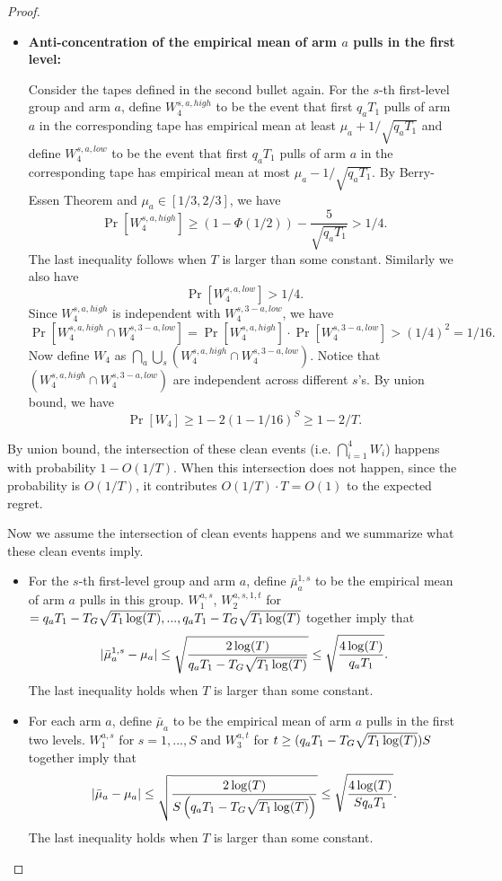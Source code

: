 \begin{proof}
\begin{itemize}
\item \textbf{Anti-concentration of the empirical mean of arm $a$ pulls in the first level:}

Consider the tapes defined in the second bullet again. For the $s$-th first-level group and arm $a$, define $W_4^{s,a,high}$  to be the event that first $q_a T_1$ pulls of arm $a$ in the corresponding tape has empirical mean at least $\mu_a + 1/\sqrt{q_a T_1}$ and define  $W_4^{s,a,low}$  to be the event that first $q_a T_1$ pulls of arm $a$ in the corresponding tape has empirical mean at most $\mu_a - 1/\sqrt{q_a T_1}$. By Berry-Essen Theorem and $\mu_a \in [1/3,2/3]$, we have
\[
\Pr[W_4^{s,a,high}] \geq (1-\Phi(1/2)) - \frac{5}{\sqrt{q_aT_1}} > 1/4.
\]
The last inequality follows when $T$ is larger than some constant.
Similarly we also have 
\[
\Pr[W_4^{s,a,low}] > 1/4.
\]
Since $W_4^{s,a,high}$ is independent with $W_4^{s,3-a,low}$, we have
\[
\Pr[W_4^{s,a,high} \cap W_4^{s,3-a,low}] =\Pr[W_4^{s,a,high}] \cdot  \Pr[W_4^{s,3-a,low}]>(1/4)^2 = 1/16.
\]
Now define $W_4$ as $\bigcap_a \bigcup_s (W_4^{s,a,high} \cap W_4^{s,3-a,low})$. Notice that $(W_4^{s,a,high} \cap W_4^{s,3-a,low})$ are independent across different $s$'s. By union bound, we have
\[
\Pr[W_4] \geq 1- 2(1-1/16)^S \geq 1 -2 /T.
\]
\end{itemize}

By union bound, the intersection of these clean events (i.e. $\bigcap_{i=1}^4 W_i$) happens with probability $1-O(1/T)$. When this intersection does not happen, since the probability is $O(1/T)$, it contributes $O(1/T) \cdot T = O(1)$ to the expected regret. 

Now we assume the intersection of clean events happens and we summarize what these clean events imply.

\begin{itemize}
\item For the $s$-th first-level group and arm $a$, define $\bar{\mu}_a^{1,s}$ to be the empirical mean of arm $a$ pulls in this group. $W_1^{a,s}$, $W_2^{a,s,1,t}$ for $ = q_a T_1- T_G \sqrt{T_1\log(T)},...,q_a T_1- T_G \sqrt{T_1\log(T)}$ together imply that
\[
|\bar{\mu}_a^{1,s} - \mu_a| \leq \sqrt{\frac{2\log(T)}{q_a T_1- T_G \sqrt{T_1\log(T)}}} \leq \sqrt{\frac{4\log(T)}{q_a T_1}}.
\]
The last inequality holds when $T$ is larger than some constant.
\item For each arm $a$, define $\bar{\mu}_a$ to be the empirical mean of arm $a$ pulls in the first two levels. $W_1^{a,s}$ for $s=1,...,S$ and $W_3^{a,t}$ for $t \geq  (q_a T_1- T_G \sqrt{T_1\log(T)})S$ together imply that
\[
|\bar{\mu}_a - \mu_a| \leq \sqrt{\frac{2\log(T)}{S\left(q_a T_1- T_G \sqrt{T_1\log(T)}\right)}} \leq \sqrt{\frac{4\log(T)}{S q_a T_1}} .
\]
The last inequality holds when $T$ is larger than some constant.


\end{itemize}
\end{proof}

